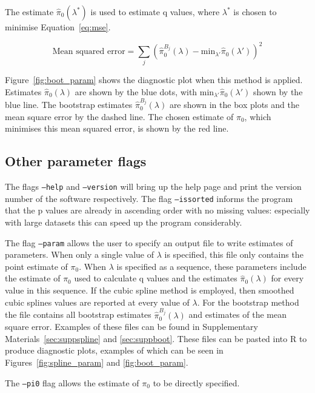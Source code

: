 \documentclass{amsart}
\begin{document}
The estimate $\hat{\pi}_0(\lambda^*)$ is used to estimate q values,  where $\lambda^*$ is chosen to minimise Equation~\ref{eq:mse}.

\begin{equation}
\text{Mean squared error} = \sum_j (\hat{\pi}^{B_j}_0(\lambda) - \text{min}_{\lambda'}\hat{\pi}_0(\lambda'))^2\label{eq:mse}
\end{equation}

Figure~\ref{fig:boot_param} shows the diagnostic plot when this method is applied. Estimates $\hat{\pi}_0(\lambda)$ are shown by the blue dots, with $\text{min}_{\lambda'}\hat{\pi}_0(\lambda')$ shown by the blue line. The bootstrap estimates $\hat{\pi}^{B_j}_0(\lambda)$ are shown in the box plots and the mean square error by the dashed line. The chosen estimate of $\pi_0$, which minimises this mean squared error, is shown by the red line.

\subsection{Other parameter flags}

The flags \texttt{--help} and \texttt{--version} will bring up the help page and print the version number of the software respectively. The flag \texttt{--issorted} informs the program that the p values are already in ascending order with no missing values: especially with large datasets this can speed up the program considerably.

The flag \texttt{--param} allows the user to specify an output file to write estimates of parameters. When only a single value of $\lambda$ is specified, this file only contains the point estimate of $\pi_0$. When $\lambda$ is specified as a sequence, these parameters include the estimate of $\pi_0$ used to calculate q values and the estimates $\hat{\pi}_0(\lambda)$ for every value in this sequence. If the cubic spline method is employed, then smoothed cubic splines values are reported at every value of $\lambda$. For the bootstrap method the file contains all bootstrap estimates $\hat{\pi}^{B_j}_0(\lambda)$ and estimates of the mean square error. Examples of these files can be found in Supplementary Materials~\ref{sec:suppspline} and \ref{sec:suppboot}. These files can be pasted into R to produce diagnostic plots, examples of which can be seen in Figures~\ref{fig:spline_param} and \ref{fig:boot_param}.

The \texttt{--pi0} flag allows the estimate of $\pi_0$ to be directly specified.
\end{document}
